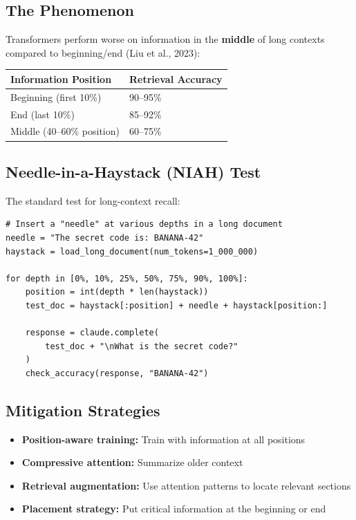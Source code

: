 \documentclass[11pt,a4paper]{article}
\begin{document}
\subsection{The Phenomenon}

Transformers perform worse on information in the \textbf{middle} of long contexts compared to beginning/end (Liu et al., 2023):

\begin{center}
\begin{tabular}{ll}
\toprule
\textbf{Information Position} & \textbf{Retrieval Accuracy} \\
\midrule
Beginning (first 10\%) & 90--95\% \\
End (last 10\%) & 85--92\% \\
Middle (40--60\% position) & 60--75\% \\
\bottomrule
\end{tabular}
\end{center}

\subsection{Needle-in-a-Haystack (NIAH) Test}

The standard test for long-context recall:

\begin{lstlisting}[basicstyle=\ttfamily\small, caption={NIAH Test Setup}]
# Insert a "needle" at various depths in a long document
needle = "The secret code is: BANANA-42"
haystack = load_long_document(num_tokens=1_000_000)

for depth in [0%, 10%, 25%, 50%, 75%, 90%, 100%]:
    position = int(depth * len(haystack))
    test_doc = haystack[:position] + needle + haystack[position:]
    
    response = claude.complete(
        test_doc + "\nWhat is the secret code?"
    )
    check_accuracy(response, "BANANA-42")
\end{lstlisting}

\subsection{Mitigation Strategies}

\begin{itemize}[itemsep=1pt]
  \item \textbf{Position-aware training:} Train with information at all positions
  \item \textbf{Compressive attention:} Summarize older context
  \item \textbf{Retrieval augmentation:} Use attention patterns to locate relevant sections
  \item \textbf{Placement strategy:} Put critical information at the beginning or end
\end{itemize}
\end{document}
